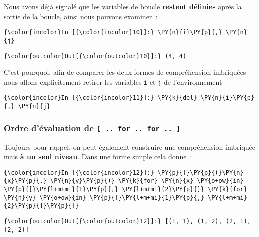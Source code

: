     Nous avons déjà signalé que les variables de boucle \textbf{restent
définies} après la sortie de la boucle, ainsi nous pouvons examiner~:

    \begin{Verbatim}[commandchars=\\\{\}]
{\color{incolor}In [{\color{incolor}10}]:} \PY{n}{i}\PY{p}{,} \PY{n}{j}
\end{Verbatim}


\begin{Verbatim}[commandchars=\\\{\}]
{\color{outcolor}Out[{\color{outcolor}10}]:} (4, 4)
\end{Verbatim}
            
    C'est pourquoi, afin de comparer les deux formes de compréhension
imbriquées nous allons explicitement retirer les variables \texttt{i} et
\texttt{j} de l'environnement

    \begin{Verbatim}[commandchars=\\\{\}]
{\color{incolor}In [{\color{incolor}11}]:} \PY{k}{del} \PY{n}{i}\PY{p}{,} \PY{n}{j}
\end{Verbatim}


    \hypertarget{ordre-duxe9valuation-de-..-for-..-for-..}{%
\subsubsection{\texorpdfstring{Ordre d'évaluation de
\texttt{{[}\ ..\ for\ ..\ for\ ..\ {]}}}{Ordre d'évaluation de {[} .. for .. for .. {]}}}\label{ordre-duxe9valuation-de-..-for-..-for-..}}

    Toujours pour rappel, on peut également construire une compréhension
imbriquée mais \textbf{à un seul niveau}. Dans une forme simple cela
donne~:

    \begin{Verbatim}[commandchars=\\\{\}]
{\color{incolor}In [{\color{incolor}12}]:} \PY{p}{[}\PY{p}{(}\PY{n}{x}\PY{p}{,} \PY{n}{y}\PY{p}{)} \PY{k}{for} \PY{n}{x} \PY{o+ow}{in} \PY{p}{[}\PY{l+m+mi}{1}\PY{p}{,} \PY{l+m+mi}{2}\PY{p}{]} \PY{k}{for} \PY{n}{y} \PY{o+ow}{in} \PY{p}{[}\PY{l+m+mi}{1}\PY{p}{,} \PY{l+m+mi}{2}\PY{p}{]}\PY{p}{]}
\end{Verbatim}


\begin{Verbatim}[commandchars=\\\{\}]
{\color{outcolor}Out[{\color{outcolor}12}]:} [(1, 1), (1, 2), (2, 1), (2, 2)]
\end{Verbatim}
            
